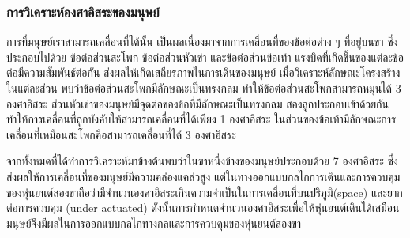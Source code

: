 \clearpage
\subsubsection{การวิเคราะห์องศาอิสระของมนุษย์}
การที่มนุษย์เราสามารถเคลื่อนที่ได้นั้น เป็นผลเนื่องมาจากการเคลื่อนที่ของข้อต่อต่าง ๆ ที่อยู่บนขา ซึ่งประกอบไปด้วย ข้อต่อส่วนสะโพก ข้อต่อส่วนหัวเข่า และข้อต่อส่วนข้อเท้า
แรงบิดที่เกิดขึ้นของแต่ละข้อต่อมีความสัมพันธ์ต่อกัน ส่งผลให้เกิดเสถียรภาพในการเดินของมนุษย์
เมื่อวิเคราะห์ลักษณะโครงสร้างในแต่ละส่วน พบว่าข้อต่อส่วนสะโพกมีลักษณะเป็นทรงกลม 
ทำให้ข้อต่อส่วนสะโพกสามารถหมุนได้ 3 องศาอิสระ ส่วนหัวเข่าของมนุษย์มีจุดต่อของข้อที่มีลักษณะเป็นทรงกลม
สองลูกประกอบเข้าด้วยกันทำให้การเคลื่อนที่ถูกบังคับให้สามารถเคลื่อนที่ได้เพียง 1 องศาอิสระ
ในส่วนของข้อเท้ามีลักษณะการเคลื่อนที่เหมือนสะโพกคือสามารถเคลื่อนที่ได้ 3 องศาอิสระ

จากทั้งหมดที่ได้ทำการวิเคราะห์มาข้างต้นพบว่าในขาหนึ่งข้างของมนุษย์ประกอบด้วย 7 องศาอิสระ
ซึ่งส่งผลให้การเคลื่อนที่ของมนุษย์มีความคล่องแคล่วสูง แต่ในทางออกแบบกลไกการเดินและการควบคุม
ของหุ่นยนต์สองขาถือว่ามีจำนวนองศาอิสระเกินความจำเป็นในการเคลื่อนที่บนปริภูมิ(space) และยากต่อการควบคุม
(under actuated) ดังนั้นการกำหนดจำนวนองศาอิสระเพื่อให้หุ่นยนต์เดินได้เสมือนมนุษย์จึงมีผลในการออกแบบกลไกทางกลและการควบคุมของหุ่นยนต์สองขา 

